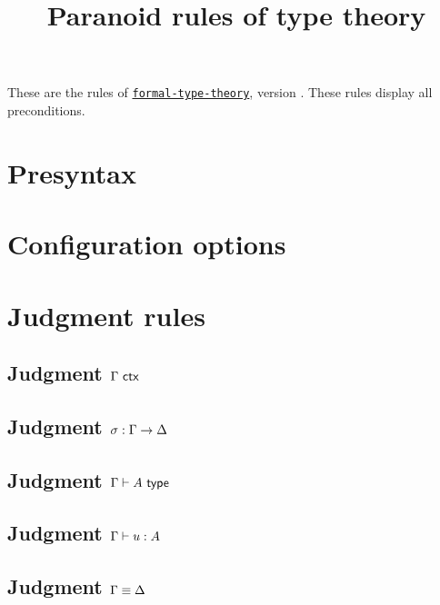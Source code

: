 \documentclass{article}
\begin{document}
\title{Paranoid rules of type theory}
\author{}
\maketitle

These are the rules of
\href{https://github.com/TheoWinterhalter/formal-type-theory}{\texttt{formal-type-theory}},
version \texttt{}. These rules display all preconditions.

\section{Presyntax}



\section{Configuration options}



\section{Judgment rules}

\subsection{Judgment $\Gamma\ \mathsf{ctx}$}

\isctxRulesParanoid

\subsection{Judgment $\sigma : \Gamma \to \Delta$}

\issubstRulesParanoid

\subsection{Judgment $\Gamma \vdash A \ \mathsf{type}$}

\istypeRulesParanoid

\subsection{Judgment $\Gamma \vdash u : A$}

\istermRulesParanoid

\subsection{Judgment $\Gamma \equiv \Delta$}
\end{document}
